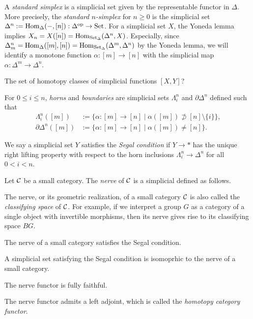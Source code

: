 \documentclass{../../../small}
\begin{document}
\begin{prb}
A \emph{standard simplex} is a simplicial set given by the representable functor in $\Delta$.
More precisely, the \emph{standard $n$-simplex} for $n\ge0$ is the simplicial set $\Delta^n:=\operatorname{Hom}_\Delta(-,[n]):\Delta^{\mathrm{op}}\to\operatorname{Set}$.
For a simplicial set $X$, the Yoneda lemma implies $X_n=X([n])=\operatorname{Hom}_{\operatorname{Set}_\Delta}(\Delta^n,X)$.
Especially, since $\Delta_m^n=\operatorname{Hom}_\Delta([m],[n])=\operatorname{Hom}_{\operatorname{Set}_\Delta}(\Delta^m,\Delta^n)$ by the Yoneda lemma, we will identify a monotone function $\alpha:[m]\to[n]$ with the simplicial map $\alpha:\Delta^m\to\Delta^n$.


The set of homotopy classes of simplicial functions $[X,Y]$?

For $0\le i\le n$, \emph{horns} and \emph{boundaries} are simplicial sets $\Lambda_i^n$ and $\partial\Delta^n$ defined such that
\begin{align*}
\Lambda_i^n([m])&:=\{\alpha:[m]\to[n]\mid\alpha([m])\not\supset[n]\setminus\{i\}\},\\
\partial\Delta^n([m])&:=\{\alpha:[m]\to[n]\mid\alpha([m])\ne[n]\}.
\end{align*}

\end{prb}




\begin{prb}[Nerves]
We say a simplicial set $Y$ satisfies the \emph{Segal condition} if $Y\to*$ has the unique right lifting property with respect to the horn inclusions $\Lambda_i^n\to\Delta^n$ for all $0<i<n$.


Let $\mathcal{C}$ be a small category.
The \emph{nerve} of $\mathcal{C}$ is a simplicial defined as follows.




The nerve, or its geometric realization, of a small category $\mathcal{C}$ is also called the \emph{classifying space} of $\mathcal{C}$.
For example, if we interpret a group $G$ as a category of a single object with invertible morphisms, then its nerve gives rise to its classifying space $BG$.
\begin{parts}
\item The nerve of a small category satisfies the Segal condition.
\item A simplicial set satisfying the Segal condition is isomoprhic to the nerve of a small category.
\item The nerve functor is fully faithful.
\item The nerve functor admits a left adjoint, which is called the \emph{homotopy category functor}.
\end{parts}
\end{prb}
\end{document}
